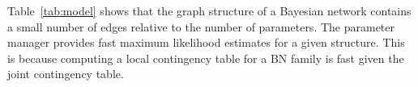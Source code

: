 \documentclass{IEEEtran}
\begin{document}
Table~\ref{tab:model} shows that the graph structure of a Bayesian network contains a small number of edges relative to the number of parameters. 
The parameter manager provides fast maximum likelihood estimates for a given structure. 
This is because computing a local contingency table for a BN family is fast given the joint contingency table.
%

\begin{table}[htbp]
\caption{Model Manager Evaluation.}
  \centering
  \label{tab:model}%
\end{table}%
\end{document}
